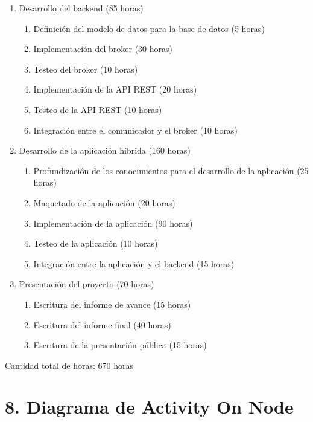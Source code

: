 \documentclass[
11pt, %
]{charter}
\begin{document}
\begin{enumerate}
	\item Desarrollo del backend (85 horas)
		\begin{enumerate}
			\item Definición del modelo de datos para la base de datos (5 horas)
			\item Implementación del broker (30 horas)
			\item Testeo del broker (10 horas)
			\item Implementación de la API REST (20 horas)
			\item Testeo de la API REST (10 horas)
			\item Integración entre el comunicador y el broker (10 horas)
		\end{enumerate}
	\item Desarrollo de la aplicación híbrida (160 horas)
		\begin{enumerate}
			\item Profundización de los conocimientos para el desarrollo de la aplicación (25 horas)
			\item Maquetado de la aplicación (20 horas)
			\item Implementación de la aplicación (90 horas)
			\item Testeo de la aplicación (10 horas)
			\item Integración entre la aplicación y el backend (15 horas)
		\end{enumerate}
	\item Presentación del proyecto (70 horas)
		\begin{enumerate}
			\item Escritura del informe de avance (15 horas)
			\item Escritura del informe final (40 horas)
			\item Escritura de la presentación pública (15 horas)
		\end{enumerate}
\end{enumerate}

Cantidad total de horas: 670 horas


\section{8. Diagrama de Activity On Node}
\label{sec:AoN}
\end{document}
